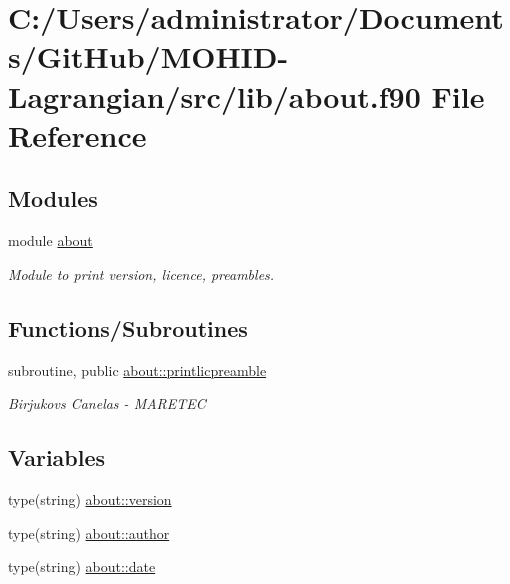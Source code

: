 \hypertarget{about_8f90}{}\section{C\+:/\+Users/administrator/\+Documents/\+Git\+Hub/\+M\+O\+H\+I\+D-\/\+Lagrangian/src/lib/about.f90 File Reference}
\label{about_8f90}
\subsection*{Modules}
\begin{DoxyCompactItemize}
\item 
module \mbox{\hyperlink{namespaceabout}{about}}
\begin{DoxyCompactList}\small\item\em Module to print version, licence, preambles. \end{DoxyCompactList}\end{DoxyCompactItemize}
\subsection*{Functions/\+Subroutines}
\begin{DoxyCompactItemize}
\item 
subroutine, public \mbox{\hyperlink{namespaceabout_aca93132913ea2de3a9eb9aa3d1c0ec9c}{about\+::printlicpreamble}}
\begin{DoxyCompactList}\small\item\em Birjukovs Canelas -\/ M\+A\+R\+E\+T\+EC \end{DoxyCompactList}\end{DoxyCompactItemize}
\subsection*{Variables}
\begin{DoxyCompactItemize}
\item 
type(string) \mbox{\hyperlink{namespaceabout_a14ee014ae64ebcd65e04112f51ca7911}{about\+::version}}
\item 
type(string) \mbox{\hyperlink{namespaceabout_a157e082adf984f1d88804d2f8217a632}{about\+::author}}
\item 
type(string) \mbox{\hyperlink{namespaceabout_a24578effbdb161e41c0b52f50e7e3ffc}{about\+::date}}
\end{DoxyCompactItemize}
